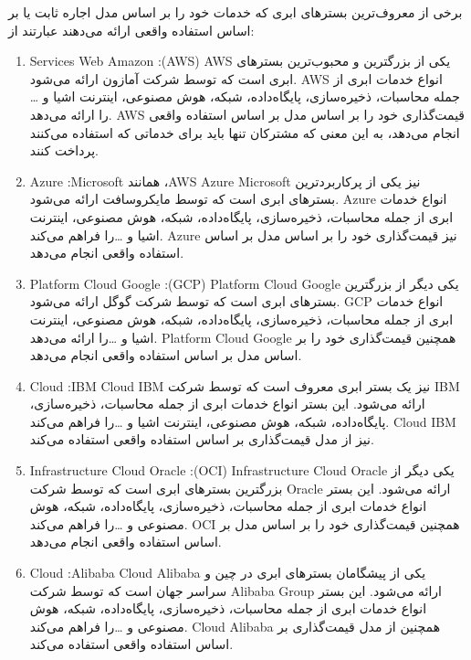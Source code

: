 \documentclass{book}
\begin{document}
            \begin{addinfo2}
                
                برخی از معروف‌ترین بسترهای ابری که خدمات خود را بر اساس مدل اجاره ثابت یا بر اساس استفاده واقعی ارائه می‌دهند عبارتند از:

                \begin{enumerate}
                    
                    \item Services Web Amazon :(AWS)  AWS یکی از بزرگترین و محبوب‌ترین بسترهای ابری است که توسط شرکت آمازون ارائه می‌شود. AWS انواع خدمات ابری از جمله محاسبات، ذخیره‌سازی، پایگاه‌داده، شبکه، هوش مصنوعی، اینترنت اشیا و \dots را ارائه می‌دهد. AWS قیمت‌گذاری خود را بر اساس مدل بر اساس استفاده واقعی انجام می‌دهد، به این معنی که مشترکان تنها باید برای خدماتی که استفاده می‌کنند پرداخت کنند.

                    \item Azure :Microsoft همانند ،AWS Azure Microsoft نیز یکی از پرکاربردترین بسترهای ابری است که توسط مایکروسافت ارائه می‌شود. Azure انواع خدمات ابری از جمله محاسبات، ذخیره‌سازی، پایگاه‌داده، شبکه، هوش مصنوعی، اینترنت اشیا و \dots را فراهم می‌کند. Azure نیز قیمت‌گذاری خود را بر اساس مدل بر اساس استفاده واقعی انجام می‌دهد.

                    \item Platform Cloud Google :(GCP) Platform Cloud Google یکی دیگر از بزرگترین بسترهای ابری است که توسط شرکت گوگل ارائه می‌شود. GCP انواع خدمات ابری از جمله محاسبات، ذخیره‌سازی، پایگاه‌داده، شبکه، هوش مصنوعی، اینترنت اشیا و \dots را ارائه می‌دهد. Platform Cloud Google همچنین قیمت‌گذاری خود را بر اساس مدل بر اساس استفاده واقعی انجام می‌دهد.

                    \item Cloud :IBM Cloud IBM نیز یک بستر ابری معروف است که توسط شرکت IBM ارائه می‌شود. این بستر انواع خدمات ابری از جمله محاسبات، ذخیره‌سازی، پایگاه‌داده، شبکه، هوش مصنوعی، اینترنت اشیا و \dots را فراهم می‌کند. Cloud IBM نیز از مدل قیمت‌گذاری بر اساس استفاده واقعی استفاده می‌کند.

                    \item Infrastructure Cloud Oracle :(OCI) Infrastructure Cloud Oracle یکی دیگر از بزرگترین بسترهای ابری است که توسط شرکت Oracle ارائه می‌شود. این بستر انواع خدمات ابری از جمله محاسبات، ذخیره‌سازی، پایگاه‌داده، شبکه، هوش مصنوعی و \dots را فراهم می‌کند. OCI همچنین قیمت‌گذاری خود را بر اساس مدل بر اساس استفاده واقعی انجام می‌دهد.

                    \item Cloud :Alibaba Cloud Alibaba یکی از پیشگامان بسترهای ابری در چین و سراسر جهان است که توسط شرکت Alibaba Group ارائه می‌شود. این بستر انواع خدمات ابری از جمله محاسبات، ذخیره‌سازی، پایگاه‌داده، شبکه، هوش مصنوعی و \dots را فراهم می‌کند. Cloud Alibaba همچنین از مدل قیمت‌گذاری بر اساس استفاده واقعی استفاده می‌کند.


\end{enumerate}
\end{addinfo2}
\end{document}
